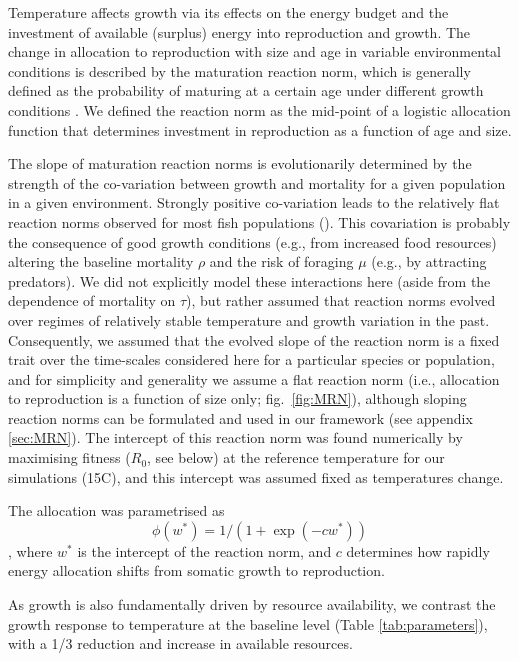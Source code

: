 \documentclass[11pt]{article}\usepackage[]{graphicx}\usepackage[]{color,soul}
\begin{document}
Temperature affects growth via its effects on the energy budget and the investment of available (surplus) energy into reproduction and growth. The change in allocation to reproduction with size and age in variable environmental conditions is described by the maturation reaction norm, which is generally defined as the probability of maturing at a certain age under different growth conditions \cite[e.g., ][]{dieckmann_probabilistic_2007}. We defined the reaction norm as the mid-point of a logistic allocation function that determines investment in reproduction as a function of age and size. 

The slope of maturation reaction norms is evolutionarily determined by the strength of the co-variation between growth and mortality for a given population in a given environment. Strongly positive co-variation leads to the relatively flat reaction norms observed for most fish populations (\citealt{marty_impact_2011}). This covariation is probably the consequence of good growth conditions (e.g., from increased food resources) altering the baseline mortality $\rho$ and the risk of foraging $\mu$ (e.g., by attracting predators). We did not explicitly model these interactions here (aside from the dependence of mortality on $\tau$), but rather assumed that reaction norms evolved over regimes of relatively stable temperature and growth variation in the past. Consequently, we assumed that the evolved slope of the reaction norm is a fixed trait over the time-scales considered here for a particular species or population, and for simplicity and generality we assume a flat reaction norm (i.e., allocation to reproduction is a function of size only; fig.~\ref{fig:MRN}), although sloping reaction norms can be formulated and used in our framework (see appendix \ref{sec:MRN}). The intercept of this reaction norm was found numerically by maximising fitness ($R_0$, see below) at the reference temperature for our simulations (15\degree C), and this intercept was assumed fixed as temperatures change.

The allocation was parametrised as 
\[ \phi(w^*) = 1/(1+\exp(-cw^*))\],
where $w^*$ is the intercept of the reaction norm, and $c$ determines how rapidly energy allocation shifts from somatic growth to reproduction. 

As growth is also fundamentally driven by resource availability, we contrast the growth response to temperature at the baseline level (Table \ref{tab:parameters}), with a 1/3 reduction and increase in available resources.
\end{document}
